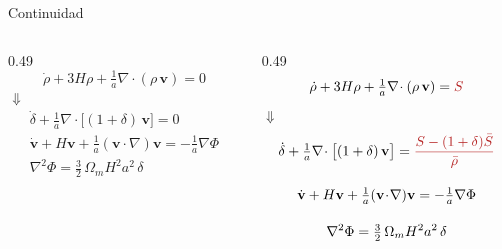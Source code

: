 \documentclass[aspectratio=169]{beamer}
\newcommand{\dil}[1]{\textcolor{myred}{#1}}   %
\begin{document}
\begin{frame}{Continuidad}
  \begin{columns}[c]
    \begin{column}{0.49\textwidth}
      \centering
      {\LARGE
      \[
        \dot\rho + 3H\rho + \tfrac1a\nabla\!\cdot(\rho\,\mathbf v) = 0
      \]}
      \vspace{0.2em}
      {\LARGE\textcolor{UNAMGold}{$\Downarrow$}}
      \vspace{0.4em}
      {\large
      \begin{gather*}
        \dot\delta + \tfrac1a\nabla\!\cdot\big[(1+\delta)\,\mathbf v\big] = 0\\[1.0em]
        \dot{\mathbf v} + H\mathbf v + \tfrac1a(\mathbf v\!\cdot\!\nabla)\mathbf v = -\tfrac1a\nabla\Phi\\[1.0em]
        \nabla^2\Phi = \tfrac32\,\Omega_m H^2 a^2\,\delta
      \end{gather*}}
    \end{column}
    \vrule
    \begin{column}{0.49\textwidth}
      \centering
      {\LARGE
      \[
        \dot\rho + 3H\rho + \tfrac1a\nabla\!\cdot(\rho\,\mathbf v) = \dil{S}
      \]}
      \vspace{0.2em}
      {\LARGE\textcolor{UNAMGold}{$\Downarrow$}}
      \vspace{0.4em}
      {\large
      \begin{gather*}
        \dot\delta + \tfrac1a\nabla\!\cdot\big[(1+\delta)\,\mathbf v\big] = \dil{\frac{S-(1+\delta)\bar S}{\bar\rho}}\\[1.0em]
        \dot{\mathbf v} + H\mathbf v + \tfrac1a(\mathbf v\!\cdot\!\nabla)\mathbf v = -\tfrac1a\nabla\Phi\\[1.0em]
        \nabla^2\Phi = \tfrac32\,\Omega_m H^2 a^2\,\delta
      \end{gather*}}
    \end{column}
  \end{columns}
\end{frame}
\end{document}
